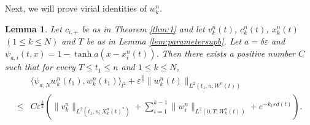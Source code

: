 \documentclass[11pt]{amsart}
\newtheorem{lemma}[theorem]{Lemma}
\theoremstyle{remark}
\numberwithin{equation}{section}
\begin{document}
Next, we will prove virial identities of $w_k^n$.
\begin{lemma}
  \label{lem:virialv2k}
Let $c_{i,+}$ be as in Theorem \ref{thm:1} and let $v_k^n(t)$, $c_k^n(t)$,
$x_k^n(t)$ $(1\le k\le N)$ and $T$ be as in Lemma \ref{lem:parametersupb}.
Let $a=\delta{\varepsilon}$ and ${\psi_{a,i}}(t,x)=1-\tanh a(x-x_i^n(t))$.
Then there exists a positive number $C$ such that
for every $T\le t_1\le n$ and $1\le k\le N$,
\begin{equation}
  \label{eq:locdwform}
  \begin{split} &
{\langle}\psi_{a,N}w_k^n(t_1),w_k^n(t_1){\rangle}_{l^2}+ {\varepsilon}^{\frac32}\|w_k^n(t)\|_{L^2(t_1,n;W^n(t))}
\\ \le & C{\varepsilon}^{\frac32}\left(\|v_k^n\|_{L^2(t_1,n;X_k^n(t)^*)}
+\sum_{i=1}^{k-1}\|w_i^n\|_{L^2(0,T;W_k^n(t))}+e^{-k_1{\varepsilon} d(t)}\right).
  \end{split}
\end{equation}
\end{lemma}
\end{document}
